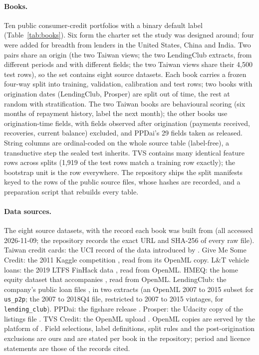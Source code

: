 \documentclass[twocolumn,10pt]{article}
\begin{document}
\paragraph{Books.} Ten public consumer-credit portfolios with a binary default label (Table~\ref{tab:books}). Six form
the charter set the study was designed around; four were added for breadth from lenders in the United States, China and
India. Two pairs share an origin (the two Taiwan views; the two LendingClub extracts, from different periods and with
different fields; the two Taiwan views share their 4,500 test rows), so the set contains eight source datasets. Each
book carries a frozen four-way split into training, validation, calibration and test rows; two books with origination
dates (LendingClub, Prosper) are split out of time, the rest at random with stratification. The two Taiwan books are
behavioural scoring (six months of repayment history, label the next month); the other books use origination-time
fields, with fields observed after origination (payments received, recoveries, current balance) excluded, and PPDai's
29 fields taken as released. String columns are ordinal-coded on the whole source table (label-free), a transductive
step the sealed test inherits. TVS contains many identical feature rows across splits (1,919 of the test rows match a
training row exactly); the bootstrap unit is the row everywhere. The repository ships the split manifests keyed to the
rows of the public source files, whose hashes are recorded, and a preparation script that rebuilds every table.

\paragraph{Data sources.} The eight source datasets, with the record each book was built from (all accessed
2026-11-09; the repository records the exact URL and SHA-256 of every raw file). Taiwan credit cards: the UCI record
\citep{yeh2009uci} of the data introduced by \citet{yeh2009comparisons}. Give Me Some Credit: the 2011 Kaggle
competition \citep{kaggle2011gmsc}, read from its OpenML copy. L\&T vehicle loans: the 2019 LTFS FinHack data
\citep{ltfs2019finhack}, read from OpenML. HMEQ: the home equity dataset that accompanies \citet{baesens2016credit},
read from OpenML. LendingClub: the company's public loan files \citep{lendingclub2019data}, in two extracts (an OpenML
2007 to 2015 subset for \texttt{us\_p2p}; the 2007 to 2018Q4 file, restricted to 2007 to 2015 vintages, for
\texttt{lending\_club}). PPDai: the figshare release \citep{he2021ppdai}. Prosper: the Udacity copy of the listings file
\citep{prosper2014udacity}. TVS Credit: the OpenML upload \citep{openml2022tvs}. OpenML copies are served by the platform
of \citet{vanschoren2014openml}. Field selections, label definitions, split rules and the post-origination exclusions
are ours and are stated per book in the repository; period and licence statements are those of the records cited.
\end{document}
